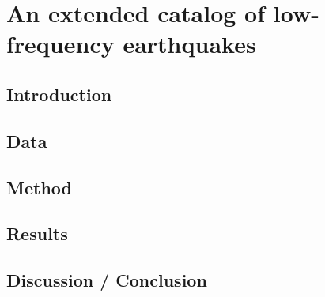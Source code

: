 \documentclass[main.tex]{subfiles}
\begin{document}
\part{An extended catalog of low-frequency earthquakes}

\chapter{Introduction}

\chapter{Data}

\chapter{Method}

\chapter{Results}

\chapter{Discussion / Conclusion}
\end{document}

